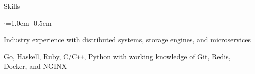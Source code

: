 \documentclass{resume} %
\begin{document}

\begin{rSection}{Skills}
  \vspace {0.5em}
  \begin{list}{$\cdot$}{\leftmargin=1.0em}
    \itemsep -0.5em \vspace{-0.5em}
    \item Industry experience with distributed systems, storage engines, and microservices
    \item Go, Haskell, Ruby, C/C\texttt{++}, Python with working knowledge of
      Git, Redis, Docker, and NGINX
  \end{list}
  \vspace{0.5em}
\end{rSection}

\end{document}
